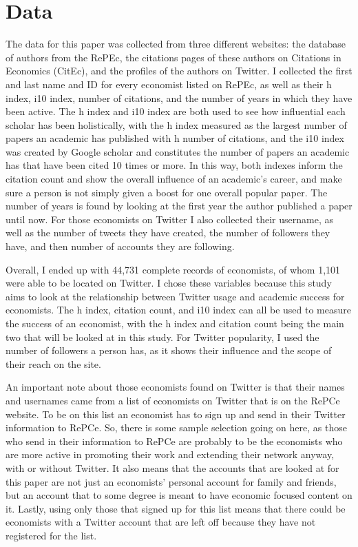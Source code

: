 \documentclass[12pt, Times New Roman]{article}
\begin{document}
\section*{Data}\label{sec:data}

The data for this paper was collected from three different websites: the database of authors from the RePEc, the citations pages of these authors on Citations in Economics (CitEc), and the profiles of the authors on Twitter. I collected the first and last name and ID for every economist listed on RePEc, as well as their h index, i10 index, number of citations, and the number of years in which they have been active. The h index and i10 index are both used to see how influential each scholar has been holistically, with the h index measured as the largest number of papers an academic has published with h number of citations, and the i10 index was created by Google scholar and constitutes the number of papers an academic has that have been cited 10 times or more. In this way, both indexes inform the citation count and show the overall influence of an academic’s career, and make sure a person is not simply given a boost for one overall popular paper. The number of years is found by looking at the first year the author published a paper until now.  For those economists on Twitter I also collected their username, as well as the number of tweets they have created, the number of followers they have, and then number of accounts they are following. 

Overall, I ended up with 44,731 complete records of economists, of whom 1,101 were able to be located on Twitter. I chose these variables because this study aims to look at the relationship between Twitter usage and academic success for economists. The h index, citation count, and i10 index can all be used to measure the success of an economist, with the h index and citation count being the main two that will be looked at in this study. For Twitter popularity, I used the number of followers a person has, as it shows their influence and the scope of their reach on the site. 

An important note about those economists found on Twitter is that their names and usernames came from a list of economists on Twitter that is on the RePCe website. To be on this list an economist has to sign up and send in their Twitter information to RePCe. So, there is some sample selection going on here, as those who send in their information to RePCe are probably to be the economists who are more active in promoting their work and extending their network anyway, with or without Twitter. It also means that the accounts that are looked at for this paper are not just an economists' personal account for family and friends, but an account that to some degree is meant to have economic focused content on it. Lastly, using only those that signed up for this list means that there could be economists with a Twitter account that are left off because they have not registered for the list.
\end{document}
